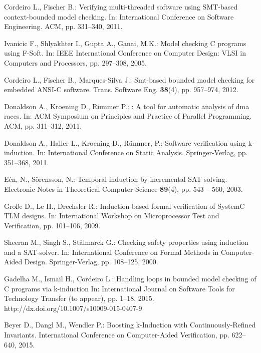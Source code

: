 \documentclass{acm_sen_article}
\begin{document}
\begin{thebibliography}{1}
Cordeiro L., Fischer B.:
\newblock Verifying multi-threaded software using {SMT}-based context-bounded
  model checking.
\newblock In: International Conference on Software Engineering. ACM,  pp. 331--340, 2011.

Ivanicic F., Shlyakhter I., Gupta A., Ganai, M.K.:
\newblock Model checking {C} programs using {F-Soft}.
\newblock In: IEEE International Conference on Computer Design: VLSI in Computers and Processors, pp. 297--308, 2005.

Cordeiro L., Fischer B., Marques{-}Silva J.:
\newblock Smt-based bounded model checking for embedded {ANSI-C} software.
 Trans. Software Eng. \textbf{38}(4), pp. 957--974, 2012.

Donaldson A., Kroening D., R{\"{u}}mmer P.:
: A tool for automatic analysis of dma races.
\newblock In: ACM Symposium on Principles and Practice of Parallel Programming. ACM, pp. 311--312, 2011.

Donaldson A., Haller L., Kroening D., R{\"{u}}mmer, P.:
\newblock Software verification using k-induction.
\newblock In: International Conference on Static Analysis. Springer-Verlag, pp. 351--368, 2011.

E{\'{e}}n, N., S{\"{o}}rensson, N.:
\newblock Temporal induction by incremental {SAT} solving.
\newblock Electronic Notes in Theoretical Computer Science \textbf{89}(4), pp. 543 -- 560, 2003.

Gro{\ss}e D., Le H., Drechsler R.:
\newblock Induction-based formal verification of {SystemC TLM} designs.
\newblock In: International Workshop on Microprocessor Test and Verification, pp. 101--106, 2009.

Sheeran M., Singh S., St{\aa}lmarck G.:
\newblock Checking safety properties using induction and a {SAT}-solver.
\newblock In: International Conference on Formal Methods in Computer-Aided Design. Springer-Verlag, pp. 108--125, 2000.

Gadelha M., Ismail H., Cordeiro L.:
\newblock Handling loops in bounded model checking of C programs via k-induction
\newblock In: International Journal on Software Tools for Technology Transfer (to appear), pp. 1--18, 2015.
\newblock http://dx.doi.org/10.1007/s10009-015-0407-9

Beyer D., Dangl M., Wendler P.:
\newblock Boosting k-Induction with Continuously-Refined Invariants.
\newblock International Conference on Computer-Aided Verification, pp. 622--640, 2015.


\end{thebibliography}
\end{document}

